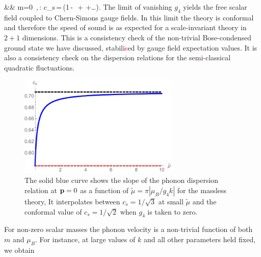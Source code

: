 && m=0 \,,\quad \tilde \mu {}\,: \qquad c_s\,=\,\left(1\,-\, \,+\,\,+\ldots\right)\textcolor{red}{.} 
\eea
The limit of vanishing $g_4$ yields the free scalar field coupled to Chern-Simons gauge fields. In this limit the theory is conformal and therefore the speed of sound is as expected for a scale-invariant theory in $2+1$ dimensions. This is a consistency check of  the non\textcolor{red}{-}trivial Bose-condensed ground state we have discussed, stabili\textcolor{red}{s}ed by gauge field expectation values. It is also a consistency check on the dispersion relations for the semi\textcolor{red}{-}classical quadratic fluctuations.
\begin{figure}[h]
\begin{center}
\includegraphics[width=3in]{Chapter_3_Folder_1806.06976/figures/soundspeed.pdf}
\end{center}
    \caption[This figure shows the value of the speed of sound as a function of the dimensionless parameter $\tilde{\mu}= \pi \left|\frac{\mu_B}{g_4 k} \right|$ for the massless theory.]{ The solid blue curve shows the slope of the phonon dispersion relation at ${\bf p} =0$ as a function of $\tilde\mu = \pi|\mu_B/g_4 k|$ for the massless theory, It interpolates between $c_s=1/\sqrt{3}$ at small $\tilde\mu$ and the conformal value of $c_s = 1/\sqrt{2}$ when $g_4$ is taken to zero.
}
\end{figure}
For non-zero scalar masses the phonon velocity is a non\textcolor{red}{-}trivial function of both $m$ and $\mu_B$.  For instance, at large values of $k$ and all other parameters held fixed, we obtain
